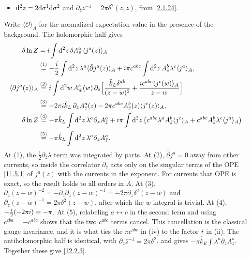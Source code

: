 \begin{tcolorbox}[breakable]
\begin{remark}
\begin{itemize}
			\item[(v)] $\mathrm{d}^{2}z=2\mathrm{d}\sigma^{1}\mathrm{d}\sigma^{2}$ and $\partial_{\bar z}z^{-1}=2\pi\delta^{2}(z,\bar z)$, from \eqref{2.1.24}.
		\end{itemize}
		Write $\langle\mathcal O\rangle_{A}$ for the normalized expectation value in the presence of the background. The holomorphic half gives
		\begin{align*}
			\delta\ln Z&=i\int\mathrm{d}^{2}z\,\delta A^{a}_{\bar z}\,\langle j^{a}(z)\rangle_{A}\\
			&\overset{(1)}{=} -\frac{i}{2}\int\mathrm{d}^{2}z\,\lambda^{a}\langle\bar\partial j^{a}(z)\rangle_{A}+i\pi c^{abc}\int\mathrm{d}^{2}z\,A^{b}_{\bar z}\lambda^{c}\langle j^{a}\rangle_{A},\\
			\langle\bar\partial j^{a}(z)\rangle_{A}&\overset{(2)}{=} i\int\mathrm{d}^{2}w\,A^{b}_{\bar w}(w)\,\partial_{\bar z}\Bigl[\frac{\hat k_{L}\delta^{ab}}{(z-w)^{2}}+\frac{i c^{abc}\langle j^{c}(w)\rangle_{A}}{z-w}\Bigr]\\
			&\overset{(3)}{=} -2\pi i\hat k_{L}\,\partial_{z}A^{a}_{\bar z}(z)-2\pi c^{abc}A^{b}_{\bar z}(z)\langle j^{c}(z)\rangle_{A},\\
			\delta\ln Z&\overset{(4)}{=} -\pi\hat k_{L}\int\mathrm{d}^{2}z\,\lambda^{a}\partial_{z}A^{a}_{\bar z}
			+i\pi\int\mathrm{d}^{2}z\,\bigl(c^{abc}\lambda^{a}A^{b}_{\bar z}\langle j^{c}\rangle_{A}+c^{abc}A^{b}_{\bar z}\lambda^{c}\langle j^{a}\rangle_{A}\bigr)\\
			&\overset{(5)}{=} -\pi\hat k_{L}\int\mathrm{d}^{2}z\,\lambda^{a}\partial_{z}A^{a}_{\bar z} .
		\end{align*}
		At (1), the $\frac12\partial_{\bar z}\lambda$ term was integrated by parts. At (2), $\bar\partial j^{a}=0$ away from other currents, so inside the correlator $\partial_{\bar z}$ acts only on the singular terms of the OPE \eqref{11.5.1} of $j^{a}(z)$ with the currents in the exponent. For currents that OPE is exact, so the result holds to all orders in $A$. At (3), $\partial_{\bar z}(z-w)^{-2}=-\partial_{z}\partial_{\bar z}(z-w)^{-1}=-2\pi\partial_{z}\delta^{2}(z-w)$ and $\partial_{\bar z}(z-w)^{-1}=2\pi\delta^{2}(z-w)$, after which the $w$ integral is trivial. At (4), $-\frac{i}{2}(-2\pi i)=-\pi$. At (5), relabeling $a\leftrightarrow c$ in the second term and using $c^{cba}=-c^{abc}$ shows that the two $c^{abc}$ terms cancel. This cancellation is the classical gauge invariance, and it is what ties the $\pi c^{abc}$ in (iv) to the factor $i$ in (ii). The antiholomorphic half is identical, with $\partial_{z}\bar z^{-1}=2\pi\delta^{2}$, and gives $-\pi\hat k_{R}\int\lambda^{a}\partial_{\bar z}A^{a}_{z}$. Together these give \eqref{12.2.3}.


\end{remark}
\end{tcolorbox}
